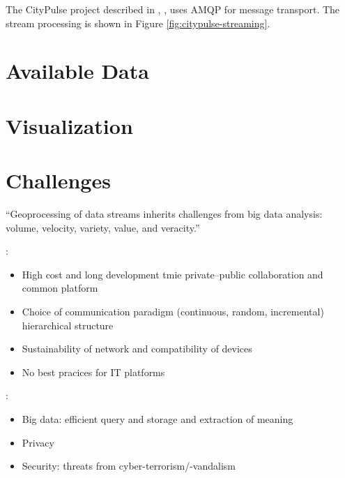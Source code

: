 \documentclass[]{scrartcl}
\begin{document}
The CityPulse project described in \cite{Tsiatsis.2015}, \cite{Presser.2016}, \cite{Puiu.2016} \cite{Puiu.2016b} uses AMQP for message transport. The stream processing is shown in Figure \ref{fig:citypulse-streaming}.

\section{Available Data}

\section{Visualization}

\section{Challenges}
\enquote{Geoprocessing of data streams inherits challenges from big data analysis: volume, velocity, variety, value, and veracity.}~\cite[p.~1]{Morales.2015}

\cite[p.~2~ff.]{Ahmed.2018}:
\begin{itemize}
	\item High cost and long development tmie \textrightarrow private--public collaboration and common platform
	\item Choice of communication paradigm (continuous, random, incremental) \textrightarrow hierarchical structure
	\item Sustainability of network and compatibility of devices
	\item No best pracices for IT platforms
\end{itemize}

\cite[p.~9~f.]{Petrolo.2017}:
\begin{itemize}
	\item Big data: efficient query and storage and extraction of meaning
	\item Privacy
	\item Security: threats from cyber-terrorism/-vandalism
\end{itemize}

\clearpage
\printbibliography
\end{document}
